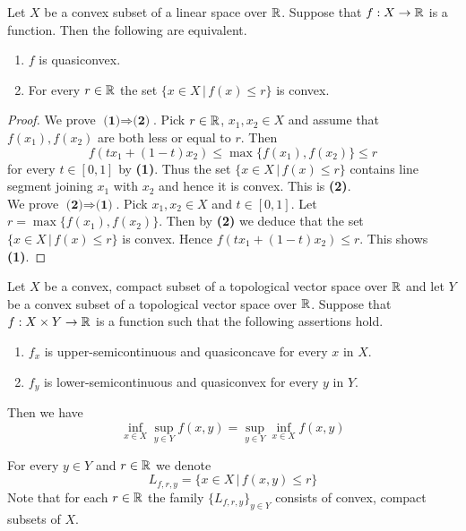 \begin{proposition}\label{proposition:characterizationofquasiconvexity}
Let $X$ be a convex subset of a linear space over ${\mathbb R}$. Suppose that $f:X \rightarrow {\mathbb R}$ is a function. Then the following are equivalent.
\begin{enumerate}[label=\emph{\textbf{(\arabic*)}}, leftmargin=1.5em]
\item $f$ is quasiconvex.
\item For every $r \in {\mathbb R}$ the set $\{x\in X\,|\,f(x)\leq r\}$ is convex.
\end{enumerate}
\end{proposition}
\begin{proof}
We prove $\textbf{(1)}\Rightarrow \textbf{(2)}$. Pick $r \in {\mathbb R}$, $x_1,x_2\in X$ and assume that $f(x_1), f(x_2)$ are both less or equal to $r$. Then
$$f\left(tx_1 + (1-t)x_2\right) \leq \max\big\{f(x_1),f(x_2)\big\} \leq r$$
for every $t\in [0,1]$ by \textbf{(1)}. Thus the set $\{x\in X\,|\,f(x)\leq r\}$ contains line segment joining $x_1$ with $x_2$ and hence it is convex. This is \textbf{(2)}.\\
We prove $\textbf{(2)}\Rightarrow \textbf{(1)}$. Pick $x_1,x_2\in X$ and $t\in [0,1]$. Let $r = \max\big\{f(x_1), f(x_2)\big\}$. Then by \textbf{(2)} we deduce that the set $\{x\in X\,|\,f(x)\leq r\}$ is convex. Hence $f\left(tx_1 + (1-t)x_2\right)\leq r$. This shows \textbf{(1)}.
\end{proof}

\begin{theorem}\label{theorem:sionsminimax}
Let $X$ be a convex, compact subset of a topological vector space over ${\mathbb R}$ and let $Y$ be a convex subset of a topological vector space over ${\mathbb R}$. Suppose that $f:X\times Y\rightarrow {\mathbb R}$ is a function such that the following assertions hold.
\begin{enumerate}[label=\emph{\textbf{(\arabic*)}}, leftmargin=1.5em]
\item $f_x$ is upper-semicontinuous and quasiconcave for every $x$ in $X$.
\item $f_y$ is lower-semicontinuous and quasiconvex for every $y$ in $Y$.
\end{enumerate}
Then we have
$$\inf_{x\in X}\sup_{y\in Y}f(x,y) = \sup_{y\in Y}\inf_{x\in X}f(x,y)$$
\end{theorem}
\noindent
For every $y\in Y$ and $r \in {\mathbb R}$ we denote
$$L_{f,r,y} = \big\{x\in X\,\big|\,f(x,y)\leq r \big\}$$
Note that for each $r\in {\mathbb R}$ the family $\{L_{f,r,y}\}_{y\in Y}$ consists of convex, compact subsets of $X$.


